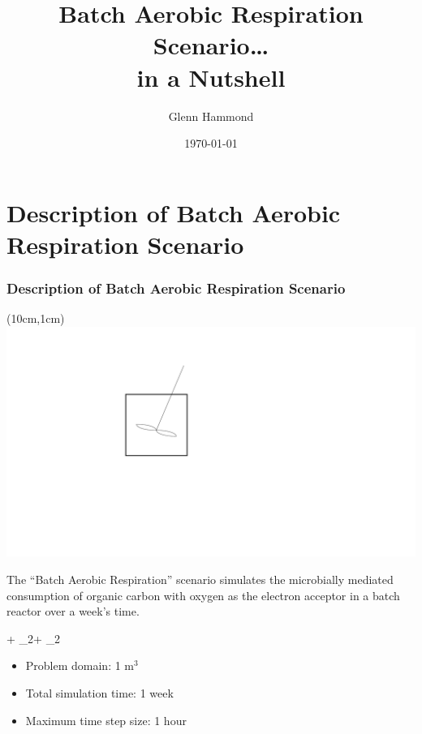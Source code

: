 \documentclass{beamer}
\def\EQ#1\EN{\begin{equation*}#1\end{equation*}}
\newcommand{\oxygen}{{\text{O}_2}}
\newcommand{\organiccarbon}{{\text{CH}_2\text{O}}}
\newcommand{\carbondioxide}{{\text{CO}_2}}
\newcommand{\water}{{\text{H}_2\text{O}}}
\begin{document}
\title{Batch Aerobic Respiration Scenario\ldots\\in a Nutshell}
\author{Glenn Hammond}
\date{\today}

\frame{\titlepage}


\section{Description of Batch Aerobic Respiration Scenario}

\begin{frame}\frametitle{Description of Batch Aerobic Respiration Scenario}

\begin{textblock*}{5cm}(10cm,1cm) %
  \includegraphics[width=0.3\linewidth]{../../.shared_files/reactor_fig}
\end{textblock*}
\vspace{1cm}
The ``Batch Aerobic Respiration'' scenario simulates the microbially mediated consumption of organic carbon with oxygen as the electron acceptor in a batch reactor over a week's time.

\EQ
\oxygen + \organiccarbon \rightarrow \carbondioxide + \water
\EN

\begin{itemize}
  \item Problem domain: 1 m$^3$
  \item Total simulation time: 1 week
  \item Maximum time step size: 1 hour
\end{itemize}

\end{frame}
\end{document}
